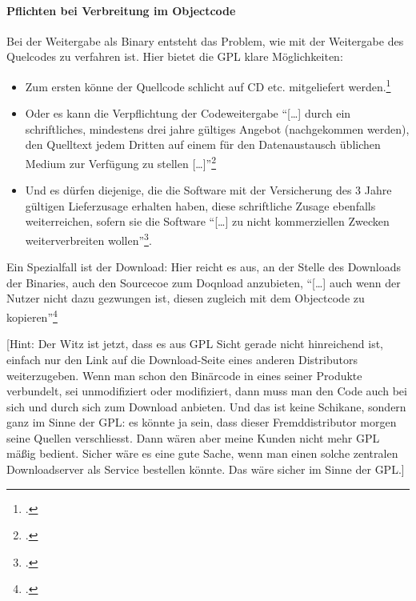\documentclass[DIV=calc,BCOR=5mm,11pt,headings=small,oneside,abstract=true, toc=bib]{scrartcl}
\begin{document}
\paragraph{Pflichten bei Verbreitung im Objectcode}

Bei der Weitergabe als Binary entsteht das Problem, wie mit der Weitergabe des
Quelcodes zu verfahren ist. Hier bietet die GPL klare Möglichkeiten:

\begin{itemize}
  \item Zum ersten könne der Quellcode schlicht auf CD etc. mitgeliefert
  werden.\footcite[vgl.][46]{Oberhem2008a}
  \item Oder es kann die Verpflichtung der Codeweitergabe \enquote{[\ldots]
  durch ein schriftliches, mindestens drei jahre gültiges Angebot
  (nachgekommen werden), den Quelltext jedem Dritten auf einem für den
  Datenaustausch üblichen Medium zur Verfügung zu stellen
  [\ldots]}\footcite[vgl.][46]{Oberhem2008a}
  \item Und es dürfen diejenige, die die Software mit der Versicherung des 3
  Jahre gültigen Lieferzusage erhalten haben, diese schriftliche Zusage
  ebenfalls weiterreichen, sofern sie die Software \enquote{[\ldots] zu nicht
  kommerziellen Zwecken weiterverbreiten
  wollen}\footcite[vgl.][47]{Oberhem2008a}.
\end{itemize}

Ein Spezialfall ist der Download: Hier reicht es aus, an der Stelle des
Downloads der Binaries, auch den Sourcecoe zum Doqnload anzubieten,
\enquote{[\ldots] auch wenn der Nutzer nicht dazu gezwungen ist, diesen
zugleich mit dem Objectcode zu kopieren}\footcite[vgl.][47]{Oberhem2008a}

[Hint: Der Witz ist jetzt, dass es aus GPL Sicht gerade nicht hinreichend ist,
einfach nur den Link auf die Download-Seite eines anderen
Distributors weiterzugeben. Wenn man schon den Binärcode in eines seiner
Produkte verbundelt, sei unmodifiziert oder modifiziert, dann muss man den Code
auch bei sich und durch sich zum Download anbieten. Und das ist keine Schikane,
sondern ganz im Sinne der GPL: es könnte ja sein, dass dieser Fremddistributor
morgen seine Quellen verschliesst. Dann wären aber meine Kunden nicht mehr GPL
mäßig bedient. Sicher wäre es eine gute Sache, wenn man einen solche zentralen
Downloadserver als Service bestellen könnte. Das wäre sicher im Sinne der GPL.]

\small

\end{document}
